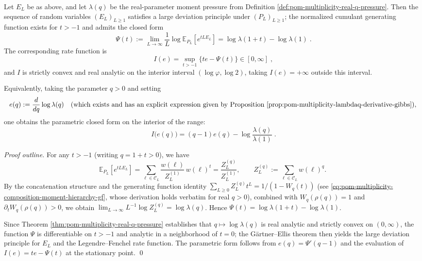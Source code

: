 \begin{theorem}\label{thm:pom-multiplicity-energy-ldp-under-PL}
Let \(E_L\) be as above, and let \(\lambda(q)\) be the real-parameter moment pressure from Definition \ref{def:pom-multiplicity-real-q-pressure}.
Then the sequence of random variables \((E_L)_{L\ge 1}\) satisfies a large deviation principle under \((P_L)_{L\ge 1}\); the normalized cumulant generating function exists for \(t>-1\) and admits the closed form
\[
\boxed{\;
\Psi(t):=\lim_{L\to\infty}\frac{1}{L}\log\mathbb{E}_{P_L}\!\left[e^{tLE_L}\right]
=\log\lambda(1+t)-\log\lambda(1)\; }.
\]
The corresponding rate function is
\[
\boxed{\;
I(e)=\sup_{t>-1}\bigl\{t e-\Psi(t)\bigr\}\in[0,\infty]\; } ,
\]
and \(I\) is strictly convex and real analytic on the interior interval \((\log\varphi,\log 2)\), taking \(I(e)=+\infty\) outside this interval.
\par
Equivalently, taking the parameter \(q>0\) and setting
\[
e(q):=\frac{d}{dq}\log\lambda(q)
\quad(\text{which exists and has an explicit expression given by Proposition \ref{prop:pom-multiplicity-lambdaq-derivative-gibbs}}),
\]
one obtains the parametric closed form on the interior of the range:
\[
\boxed{\;
I\bigl(e(q)\bigr)=(q-1)e(q)-\log\frac{\lambda(q)}{\lambda(1)}\; } .
\]
\end{theorem}
\begin{proof}[Proof outline]
For any \(t>-1\) (writing \(q=1+t>0\)), we have
\[
\mathbb{E}_{P_L}\!\left[e^{tLE_L}\right]
=\sum_{\boldsymbol{\ell}\in\mathcal{C}_L}\frac{w(\boldsymbol{\ell})}{Z_L^{(1)}}\,w(\boldsymbol{\ell})^{t}
=\frac{Z_L^{(q)}}{Z_L^{(1)}},
\qquad
Z_L^{(q)}:=\sum_{\boldsymbol{\ell}\in\mathcal{C}_L}w(\boldsymbol{\ell})^{q}.
\]
By the concatenation structure and the generating function identity \( \sum_{L\ge 0}Z_L^{(q)}t^L=1/(1-W_q(t))\) (see \eqref{eq:pom-multiplicity-composition-moment-hierarchy-gf}, whose derivation holds verbatim for real \(q>0\)), combined with \(W_q(\rho(q))=1\) and \(\partial_tW_q(\rho(q))>0\), we obtain
\(
\lim_{L\to\infty}L^{-1}\log Z_L^{(q)}=\log\lambda(q)
\).
Hence \(\Psi(t)=\log\lambda(1+t)-\log\lambda(1)\).
\par
Since Theorem \ref{thm:pom-multiplicity-real-q-pressure} establishes that \(q\mapsto\log\lambda(q)\) is real analytic and strictly convex on \((0,\infty)\), the function \(\Psi\) is differentiable on \(t>-1\) and analytic in a neighborhood of \(t=0\); the G\"artner--Ellis theorem then yields the large deviation principle for \(E_L\) and the Legendre--Fenchel rate function.
The parametric form follows from \(e(q)=\Psi'(q-1)\) and the evaluation of \(I(e)=t e-\Psi(t)\) at the stationary point. \qed
\end{proof}

